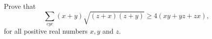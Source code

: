 Prove that
\[\sum_{cyc}(x+y)\sqrt{(z+x)(z+y)} \geq 4(xy+yz+zx),\]
for all positive real numbers $x,y$ and $z$.